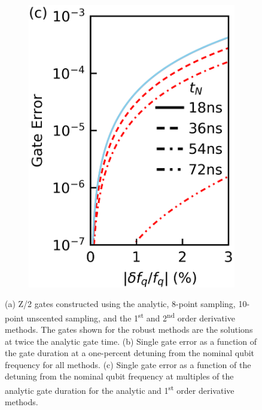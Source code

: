 \documentclass[
  amsfonts,
  amsmath,
  tbtags,
  amssymb,
  aps,
  nobibnotes,
  twocolumn,
  superscriptaddress,
]{revtex4-2}
\begin{document}
\begin{figure}[ht]
  \begin{subfigure}{.23\textwidth}
    \includegraphics[width=\linewidth]{assets/f2b.png}
  \end{subfigure}
  
  \caption{
    (a) Z/2 gates constructed using the
    analytic, 8-point sampling, 10-point unscented sampling, and the 1\textsuperscript{st}
    and 2\textsuperscript{nd} order derivative methods. The gates
    shown for the robust methods are the solutions at twice the analytic
    gate time.
    (b) Single gate error as
    a function of the gate duration at a one-percent
    detuning from the nominal qubit frequency for all methods.
    (c) Single gate error as a function of the detuning from the nominal
    qubit frequency at multiples of the analytic gate duration for the analytic
    and 1\textsuperscript{st} order derivative methods.
  }
\end{figure}
\end{document}
